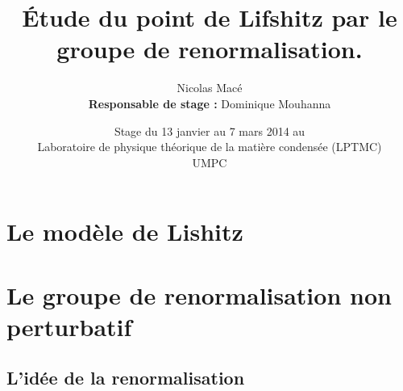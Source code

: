 \documentclass[xcolor=dvipsnames]{beamer}
\title[Étude du point de Lifshitz par le groupe de renormalisation.]{Étude du point de Lifshitz par le groupe de renormalisation.}
\date{Stage du 13 janvier au 7 mars 2014 au \\ 
Laboratoire de physique théorique de la matière condensée (LPTMC) \\ 
\small{UMPC}}
\author{Nicolas Macé \\
\textbf{Responsable de stage :} Dominique Mouhanna}
\begin{document}
\begin{frame}
\begin{titlepage}
\end{titlepage}
\end{frame}


\section{Le modèle de Lishitz}

\section{Le groupe de renormalisation non perturbatif}
\subsection{L'idée de la renormalisation}
\end{document}
